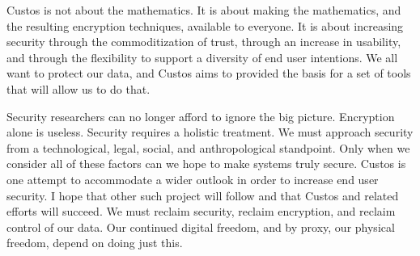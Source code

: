 Custos is not about the mathematics. It is about making the
mathematics, and the resulting encryption techniques, available to
everyone. It is about increasing security through the commoditization
of trust, through an increase in usability, and through the
flexibility to support a diversity of end user intentions. We all want
to protect our data, and Custos aims to provided the basis for a set
of tools that will allow us to do that.

Security researchers can no longer afford to ignore the big
picture. Encryption alone is useless. Security requires a holistic
treatment. We must approach security from a technological, legal,
social, and anthropological standpoint. Only when we consider all of
these factors can we hope to make systems truly secure. Custos is one
attempt to accommodate a wider outlook in order to increase end user
security. I hope that other such project will follow and that Custos
and related efforts will succeed. We must reclaim security, reclaim
encryption, and reclaim control of our data. Our continued digital
freedom, and by proxy, our physical freedom, depend on doing just
this.

